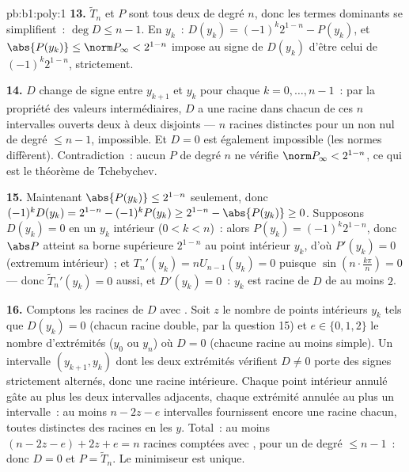 \begin{solution}{pb:b1:poly:1}
\textbf{13.} $\widetilde T_n$ et $P$ sont tous deux  de
degré $n$, donc les termes dominants se simplifient~: $\deg D \leq n
- 1$. En $y_k$~: $D(y_k) = (-1)^k2^{1-n} - P(y_k)$, et $\abs{P(y_k)}
\leq \norm P_\infty < 2^{1-n}$ impose au signe de $D(y_k)$ d'être
celui de $(-1)^k2^{1-n}$, strictement.

\textbf{14.} $D$ change de signe entre $y_{k+1}$ et $y_k$ pour
chaque $k = 0, \dots, n-1$~: par la propriété des valeurs
intermédiaires, $D$ a une racine dans chacun de ces $n$ intervalles
ouverts deux à deux disjoints --- $n$ racines distinctes pour un
 non nul de degré $\leq n - 1$, impossible. Et $D = 0$ est
également impossible (les normes diffèrent). Contradiction~: aucun
 $P$ de degré $n$ ne vérifie $\norm P_\infty <
2^{1-n}$, ce qui est le théorème de Tchebychev.

\textbf{15.} Maintenant $\abs{P(y_k)} \leq 2^{1-n}$ seulement, donc
$(-1)^k D(y_k) = 2^{1-n} - (-1)^kP(y_k) \geq 2^{1-n} - \abs{P(y_k)}
\geq 0$. Supposons $D(y_k) = 0$ en un $y_k$ intérieur ($0 < k <
n$)~: alors $P(y_k) = (-1)^k2^{1-n}$, donc $\abs P$ atteint sa borne
supérieure $2^{1-n}$ au point intérieur $y_k$, d'où $P'(y_k) = 0$
(extremum intérieur)~; et $T_n'(y_k) = nU_{n-1}(y_k) = 0$ puisque
$\sin(n\cdot\frac{k\pi}n) = 0$ --- donc $\widetilde T_n'(y_k) = 0$
aussi, et $D'(y_k) = 0$~: $y_k$ est racine de $D$ de  au
moins $2$.

\textbf{16.} Comptons les racines de $D$ avec . Soit $z$
le nombre de points intérieurs $y_k$ tels que $D(y_k) = 0$ (chacun
racine double, par la question 15) et $e \in \{0, 1, 2\}$ le nombre
d'extrémités ($y_0$ ou $y_n$) où $D = 0$ (chacune racine au moins
simple). Un intervalle $(y_{k+1}, y_k)$ dont les deux extrémités
vérifient $D \neq 0$ porte des signes strictement alternés, donc une
racine intérieure. Chaque point intérieur annulé gâte au plus les
deux intervalles adjacents, chaque extrémité annulée au plus un
intervalle~: au moins $n - 2z - e$ intervalles fournissent encore une
racine chacun, toutes distinctes des racines en les $y$. Total~: au
moins $(n - 2z - e) + 2z + e = n$ racines comptées avec ,
pour un  de degré $\leq n - 1$~: donc $D = 0$ et $P =
\widetilde T_n$. Le minimiseur est unique.


\end{solution}
